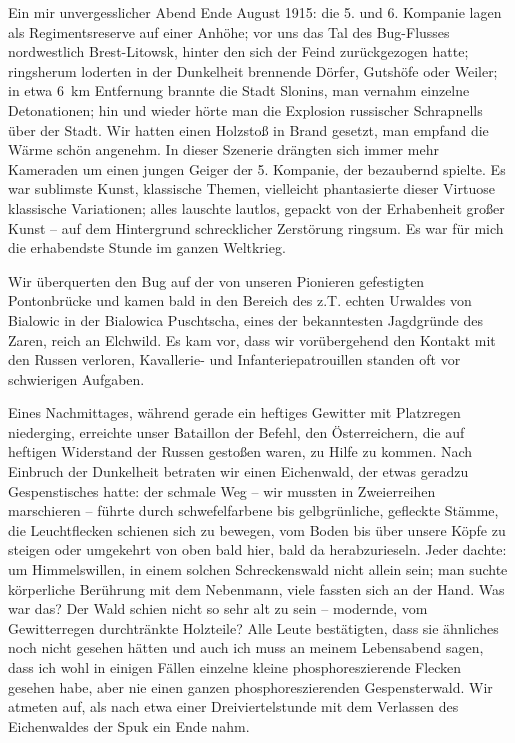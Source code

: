 Ein mir unvergesslicher Abend Ende August 1915: die 5. und 6. Kompanie lagen als Regimentsreserve auf einer Anhöhe; vor uns das Tal des Bug-Flusses nordwestlich Brest-Litowsk, hinter den sich der Feind zurückgezogen hatte; ringsherum loderten in der Dunkelheit brennende Dörfer, Gutshöfe oder Weiler; in etwa 6~km Entfernung brannte die Stadt Slonins, man vernahm einzelne Detonationen; hin und wieder hörte man die Explosion russischer Schrapnells über der Stadt. Wir hatten einen Holzstoß in Brand gesetzt, man empfand die Wärme schön angenehm. In dieser Szenerie drängten sich immer mehr Kameraden um einen jungen Geiger der 5. Kompanie, der bezaubernd spielte. Es war sublimste Kunst, klassische Themen, vielleicht phantasierte dieser Virtuose klassische Variationen; alles lauschte lautlos, gepackt von der Erhabenheit großer Kunst -- auf dem Hintergrund schrecklicher Zerstörung ringsum. Es war für mich die erhabendste Stunde im ganzen Weltkrieg.

Wir überquerten den Bug auf der von unseren Pionieren gefestigten Pontonbrücke und kamen bald in den Bereich des z.T. echten Urwaldes von Bialowic in der Bialowica Puschtscha, eines der bekanntesten Jagdgründe des Zaren, reich an Elchwild. Es kam vor, dass wir vorübergehend den Kontakt mit den Russen verloren, Kavallerie- und Infanteriepatrouillen standen oft vor schwierigen Aufgaben.

Eines Nachmittages, während gerade ein heftiges Gewitter mit Platzregen niederging, erreichte unser Bataillon der Befehl, den Österreichern, die auf heftigen Widerstand der Russen gestoßen waren, zu Hilfe zu kommen. Nach Einbruch der Dunkelheit betraten wir einen Eichenwald, der etwas geradzu Gespenstisches hatte: der schmale Weg -- wir mussten in Zweierreihen marschieren -- führte durch schwefelfarbene bis gelbgrünliche, gefleckte Stämme, die Leuchtflecken schienen sich zu bewegen, vom Boden bis über unsere Köpfe zu steigen oder umgekehrt von oben bald hier, bald da herabzurieseln. Jeder dachte: um Himmelswillen, in einem solchen Schreckenswald nicht allein sein; man suchte körperliche Berührung mit dem Nebenmann, viele fassten sich an der Hand. Was war das? Der Wald schien nicht so sehr alt zu sein -- modernde, vom Gewitterregen durchtränkte Holzteile? Alle Leute bestätigten, dass sie ähnliches noch nicht gesehen hätten und auch ich muss an meinem Lebensabend sagen, dass ich wohl in einigen Fällen einzelne kleine phosphoreszierende Flecken gesehen habe, aber nie einen ganzen phosphoreszierenden Gespensterwald. Wir atmeten auf, als nach etwa einer Dreiviertelstunde mit dem Verlassen des Eichenwaldes der Spuk ein Ende nahm.

